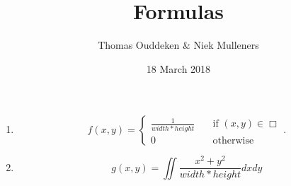\documentclass{article}
\title{Formulas}
\author{Thomas Ouddeken \& Niek Mulleners}
\date{18 March 2018}
\begin{document}
{\let \newpage \relax \maketitle}

\begin{enumerate}

\item 
\[ f(x, y) = 
	\begin{cases}
   	\frac{1}{width * height}
		& \quad \text{if } (x, y) \in \Box \\
    	0 
		& \quad \text{otherwise}
  	\end{cases} .
\]

\item \[ g(x, y) = \iint \frac{x^2+y^2}{width*height}dx dy \]

\end{enumerate}
\end{document}
